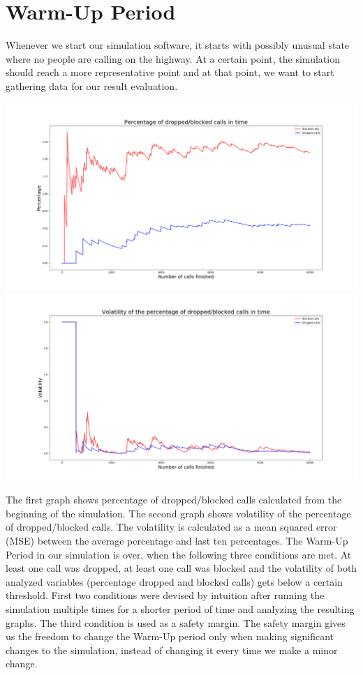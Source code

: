 \documentclass[12pt,a4paper]{article}
\begin{document}
\section{Warm-Up Period}
Whenever we start our simulation software, it starts with possibly unusual state where no people are calling on the highway. At a certain point, the simulation should reach a more representative point and at that point, we want to start gathering data for our result evaluation.
\begin{center}
\includegraphics[width=6.5in]{Figure_10}
\includegraphics[width=6.5in]{Figure_11}
\end{center}
The first graph shows percentage of dropped/blocked calls calculated from the beginning of the simulation. The second graph shows volatility of the percentage of dropped/blocked calls. The volatility is calculated as a mean squared error (MSE) between the average percentage and last ten percentages. The Warm-Up Period in our simulation is over, when the following three conditions are met. At least one call was dropped, at least one call was blocked and the volatility of both analyzed variables (percentage dropped and blocked calls) gets below a certain threshold. First two conditions were devised by intuition after running the simulation multiple times for a shorter period of time and analyzing the resulting graphs. The third condition is used as a safety margin. The safety margin gives us the freedom to change the Warm-Up period only when making significant changes to the simulation, instead of changing it every time we make a minor change.
\end{document}
